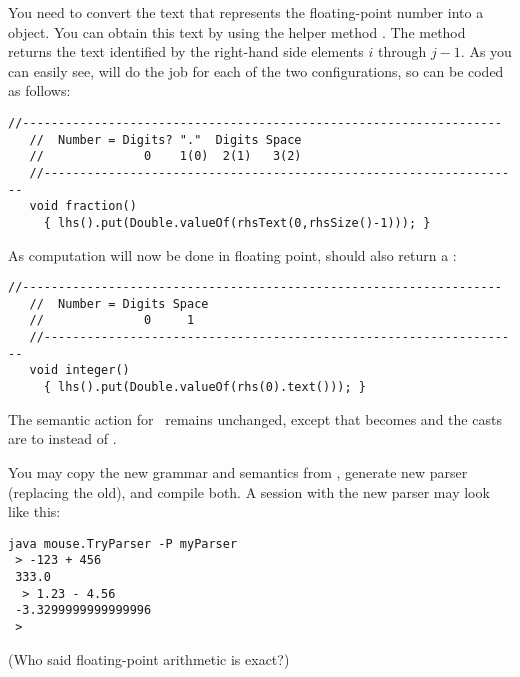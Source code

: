 You need to convert the text that represents the floating-point number
into a  object.
You can obtain this text
by using the helper method .
The method returns the text identified by the right-hand side
elements $i$ through $j-1$.
As you can easily see,  will do the
job for each of the two configurations, so  can be coded as follows:
 
\small
\begin{Verbatim}[frame=single,framesep=2mm,samepage=true,xleftmargin=15mm,xrightmargin=15mm,baselinestretch=0.8]
   //-------------------------------------------------------------------
   //  Number = Digits? "."  Digits Space
   //              0    1(0)  2(1)   3(2)
   //-------------------------------------------------------------------
   void fraction()
     { lhs().put(Double.valueOf(rhsText(0,rhsSize()-1))); }
\end{Verbatim}
\normalsize
 
As computation will now be done in floating point,
 should also return a :
 
\small
\begin{Verbatim}[frame=single,framesep=2mm,samepage=true,xleftmargin=15mm,xrightmargin=15mm,baselinestretch=0.8]
   //-------------------------------------------------------------------
   //  Number = Digits Space
   //              0     1
   //-------------------------------------------------------------------
   void integer()
     { lhs().put(Double.valueOf(rhs(0).text())); }
\end{Verbatim}
\normalsize

The semantic action for \Sum\ remains unchanged, except 
that  becomes  
and the casts are to  instead of .

You may copy the new grammar and semantics from ,
generate new parser (replacing the old), and compile both.
A session with the new parser may look like this:

\small
\begin{Verbatim}[samepage=true,xleftmargin=15mm,baselinestretch=0.8]
 java mouse.TryParser -P myParser
 > -123 + 456
 333.0
  > 1.23 - 4.56
 -3.3299999999999996
 > 
\end{Verbatim}
\normalsize
%
(Who said floating-point arithmetic is exact?)





